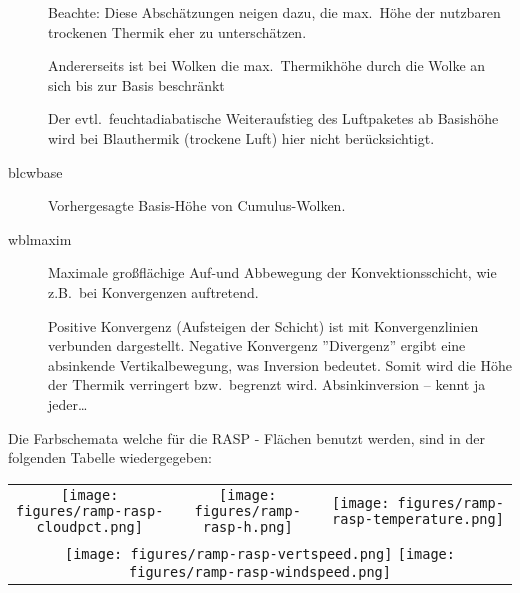 \begin{description}
Beachte: Diese Abschätzungen neigen dazu, die max.\ Höhe der
nutzbaren trockenen Thermik eher zu unterschätzen.

Andererseits ist bei Wolken die max.\ Thermikhöhe durch  die Wolke an sich bis
zur Basis  beschränkt

Der evtl.\ feuchtadiabatische Weiteraufstieg des Luftpaketes ab Basishöhe wird bei
Blauthermik (trockene Luft) hier nicht berücksichtigt.
\item[blcwbase] Vorhergesagte Basis-Höhe von Cumulus-Wolken.

\item[wblmaxim] Maximale großflächige Auf-und Abbewegung der Konvektionsschicht, wie
z.B.\ bei Konvergenzen auftretend.

Positive Konvergenz (Aufsteigen der Schicht) ist mit Konvergenzlinien verbunden dargestellt.
Negative Konvergenz ''Divergenz'' ergibt eine absinkende Vertikalbewegung, was Inversion bedeutet.
Somit wird die Höhe der Thermik verringert bzw.\ begrenzt wird.
Absinkinversion -- kennt ja jeder\dots
\end{description}

\begin{maxipage}
Die Farbschemata welche für die RASP - Flächen benutzt werden, sind in der folgenden Tabelle wiedergegeben:

\begin{longtable}{c c c}
\texttt{[image: figures/ramp-rasp-cloudpct.png]}&
\texttt{[image: figures/ramp-rasp-h.png]}&
\texttt{[image: figures/ramp-rasp-temperature.png]}\\
\multicolumn{3}{c}{\texttt{[image: figures/ramp-rasp-vertspeed.png]}\quad
\texttt{[image: figures/ramp-rasp-windspeed.png]}} \\
\end{longtable}
\end{maxipage}

